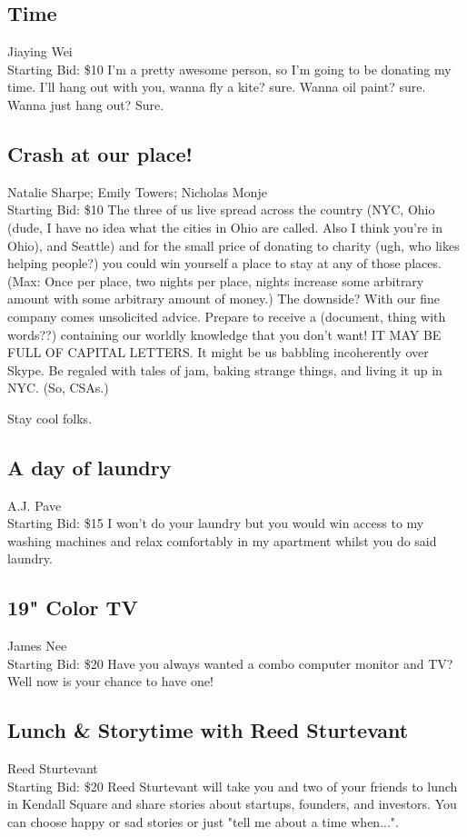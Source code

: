 \documentclass[11pt]{article}
\begin{document}
\subsection{Time}
Jiaying Wei
\\
Starting Bid: \$10
\newline
I'm a pretty awesome person, so I'm going to be donating my time. I'll hang out with you, wanna fly a kite? sure. Wanna oil paint? sure. Wanna just hang out? Sure.
\subsection{Crash at our place!}
Natalie Sharpe; Emily Towers; Nicholas Monje
\\
Starting Bid: \$10
\newline
The three of us live spread across the country (NYC, Ohio (dude, I have no idea what the cities in Ohio are called.  Also I think you're in Ohio), and Seattle) and for the small price of donating to charity (ugh, who likes helping people?) you could win yourself a place to stay at any of those places.  (Max: Once per place, two nights per place, nights increase some arbitrary amount with some arbitrary amount of money.)  The downside?  With our fine company comes unsolicited advice.  Prepare to receive a (document, thing with words??) containing our worldly knowledge that you don't want!  IT MAY BE FULL OF CAPITAL LETTERS.  It might be us babbling incoherently over Skype.  Be regaled with tales of jam, baking strange things, and living it up in NYC.  (So, CSAs.)  

Stay cool folks.
\subsection{A day of laundry}
A.J. Pave
\\
Starting Bid: \$15
\newline
I won't do your laundry but you would win access to my washing machines and relax comfortably in my apartment whilst you do said laundry.
\subsection{19" Color TV}
James Nee
\\
Starting Bid: \$20
\newline
Have you always wanted a combo computer monitor and TV? Well now is your chance to have one!
\subsection{Lunch \& Storytime with Reed Sturtevant}
Reed Sturtevant
\\
Starting Bid: \$20
\newline
Reed Sturtevant will take you and two of your friends to lunch in Kendall Square and share stories about startups, founders, and investors.  You can choose happy or sad stories or just "tell me about a time when...".
\end{document}
